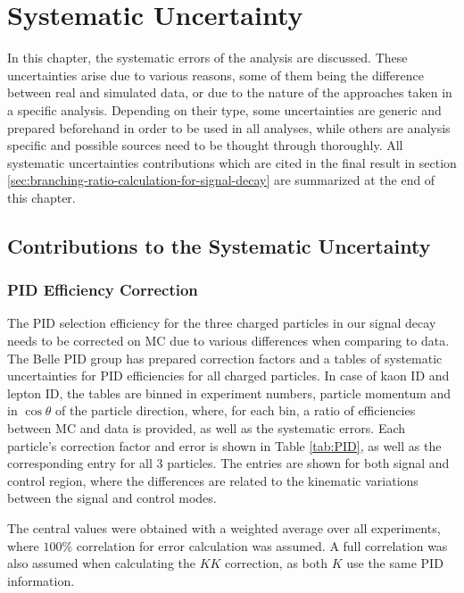 \chapter{Systematic Uncertainty}\label{sec:systematic-uncertainty}
In this chapter, the systematic errors of the analysis are discussed. These uncertainties arise due to various reasons, some of them being the difference between real and simulated data, or due to the nature of the approaches taken in a specific analysis. Depending on their type, some uncertainties are generic and prepared beforehand in order to be used in all analyses, while others are analysis specific and possible sources need to be thought through thoroughly. All systematic uncertainties contributions which are cited in the final result in section \ref{sec:branching-ratio-calculation-for-signal-decay} are summarized at the end of this chapter.

\section{Contributions to the Systematic Uncertainty}

\subsection{PID Efficiency Correction}\label{sec:pid-efficiency-correction}

The PID selection efficiency for the three charged particles in our signal decay needs to be corrected on MC due to various differences when comparing to data. The Belle PID group has prepared correction factors and a tables of systematic uncertainties for PID efficiencies for all charged particles. In case of kaon ID and lepton ID, the tables are binned in experiment numbers, particle momentum and in $\cos\theta$ of the particle direction, where, for each bin, a ratio of efficiencies between MC and data is provided, as well as the systematic errors. Each particle's correction factor and error is shown in Table \ref{tab:PID}, as well as the corresponding entry for all 3 particles. The entries are shown for both signal and control region, where the differences are related to the kinematic variations between the signal and control modes.

The central values were obtained with a weighted average over all experiments, where $100\%$ correlation for error calculation was assumed. A full correlation was also assumed when calculating the $KK$ correction, as both $K$ use the same PID information.


